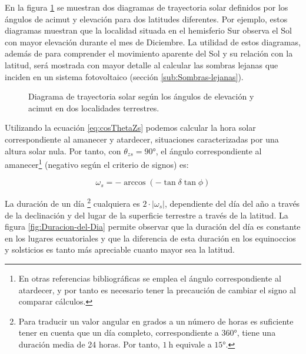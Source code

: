 En la figura \ref{fig:DiagramaElevacionAcimutSolar} se muestran dos
diagramas de trayectoria solar definidos por los ángulos de acimut
y elevación para dos latitudes diferentes. Por ejemplo, estos diagramas
muestran que la localidad situada en el hemisferio Sur observa el
Sol con mayor elevación durante el mes de Diciembre. La utilidad de
estos diagramas, además de para comprender el movimiento aparente
del Sol y su relación con la latitud, será mostrada con mayor detalle
al calcular las sombras lejanas que inciden en un sistema fotovoltaico
(sección \ref{sub:Sombras-lejanas}).


\begin{figure}
\begin{centering}
\hfill{}\hfill{}\hfill{}
\end{centering}

\caption{Diagrama de trayectoria solar según los ángulos de elevación y acimut
en dos localidades terrestres.\label{fig:DiagramaElevacionAcimutSolar}}

\end{figure}

Utilizando la ecuación \ref{eq:cosThetaZs} podemos calcular la hora
solar correspondiente al amanecer y atardecer, situaciones caracterizadas
por una altura solar nula. Por tanto, con $\theta_{zs}=\ang{90}$,
el ángulo correspondiente al amanecer\footnote{En otras referencias bibliográficas se emplea el ángulo correspondiente al atardecer, y por tanto es necesario tener la precaución de cambiar el signo al comparar cálculos.} (negativo según el criterio
de signos) es:

\begin{equation}
\omega_{s}=-\arccos(-\tan\delta\tan\phi)
\label{eq:ws}
\end{equation}

La duración de un día \footnote{Para traducir un valor angular en
  grados a un número de horas es suficiente tener en cuenta que un día
  completo, correspondiente a $\ang{360}$, tiene una duración
  media de 24 horas. Por tanto, $\SI{1}{\hour}$ equivale a
  $\ang{15}$.}  cualquiera es $2\cdot|\omega_{s}|$,
dependiente del día del año a través de la declinación y del lugar de
la superficie terrestre a través de la latitud. La figura
\ref{fig:Duracion-del-Dia} permite observar que la duración del día es
constante en los lugares ecuatoriales y que la diferencia de esta
duración en los equinoccios y solsticios es tanto más apreciable
cuanto mayor sea la latitud.


